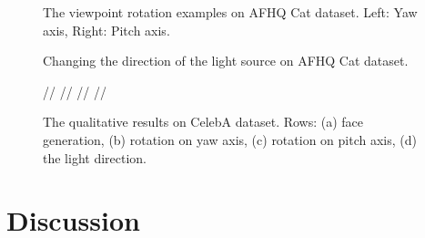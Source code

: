 \begin{figure}[h!]%
    \centering
    \qquad
    \caption{The viewpoint rotation examples on AFHQ Cat dataset. Left: Yaw axis, Right: Pitch axis.}%
    \label{fig:afhq_view}%
\end{figure}

\begin{figure}[h!]%
    \centering
    \qquad
    \caption{Changing the direction of the light source on AFHQ Cat dataset.}%
    \label{fig:afhq_light}%
\end{figure}

\begin{figure}[t!]
    \centering
     //
       //
      //
     //
    \caption{The qualitative results on CelebA dataset. Rows: (a) face generation, (b) rotation on yaw axis, (c) rotation on pitch axis, (d) the light direction.}
    \label{fig:celeba_results}
\end{figure}


\section{Discussion}

